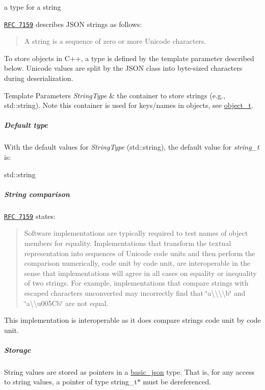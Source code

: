 a type for a string 

\href{http://rfc7159.net/rfc7159}{\tt R\+FC 7159} describes J\+S\+ON strings as follows\+: \begin{quote}
A string is a sequence of zero or more Unicode characters. \end{quote}


To store objects in C++, a type is defined by the template parameter described below. Unicode values are split by the J\+S\+ON class into byte-\/sized characters during deserialization.


\begin{DoxyTemplParams}{Template Parameters}
{\em String\+Type} & the container to store strings (e.\+g., {\ttfamily std\+::string}). Note this container is used for keys/names in objects, see \hyperlink{a00025_a0ac9894c9de8dc551cf2e5f1c605537f}{object\+\_\+t}.\\
\hline
\end{DoxyTemplParams}
\subparagraph*{Default type}

With the default values for {\itshape String\+Type} ({\ttfamily std\+::string}), the default value for {\itshape string\+\_\+t} is\+:


\begin{DoxyCode}
std::string
\end{DoxyCode}


\subparagraph*{String comparison}

\href{http://rfc7159.net/rfc7159}{\tt R\+FC 7159} states\+: \begin{quote}
Software implementations are typically required to test names of object members for equality. Implementations that transform the textual representation into sequences of Unicode code units and then perform the comparison numerically, code unit by code unit, are interoperable in the sense that implementations will agree in all cases on equality or inequality of two strings. For example, implementations that compare strings with escaped characters unconverted may incorrectly find that {\ttfamily \char`\"{}a\textbackslash{}\textbackslash{}\textbackslash{}\textbackslash{}b\char`\"{}} and {\ttfamily \char`\"{}a\textbackslash{}\textbackslash{}u005\+Cb\char`\"{}} are not equal. \end{quote}


This implementation is interoperable as it does compare strings code unit by code unit.

\subparagraph*{Storage}

String values are stored as pointers in a \hyperlink{a00025}{basic\+\_\+json} type. That is, for any access to string values, a pointer of type {\ttfamily string\+\_\+t$\ast$} must be dereferenced.

